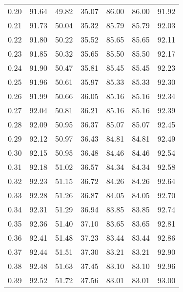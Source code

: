 \begin{tabular}{|c|c|c|c|c|c|c|}
      0.20 &     91.64 &     49.82 &      35.07 &   86.00 &      86.00 &         91.92 \\
      0.21 &     91.73 &     50.04 &      35.32 &   85.79 &      85.79 &         92.03 \\
      0.22 &     91.80 &     50.22 &      35.52 &   85.65 &      85.65 &         92.11 \\
      0.23 &     91.85 &     50.32 &      35.65 &   85.50 &      85.50 &         92.17 \\
      0.24 &     91.90 &     50.47 &      35.81 &   85.45 &      85.45 &         92.23 \\
      0.25 &     91.96 &     50.61 &      35.97 &   85.33 &      85.33 &         92.30 \\
      0.26 &     91.99 &     50.66 &      36.05 &   85.16 &      85.16 &         92.34 \\
      0.27 &     92.04 &     50.81 &      36.21 &   85.16 &      85.16 &         92.39 \\
      0.28 &     92.09 &     50.95 &      36.37 &   85.07 &      85.07 &         92.45 \\
      0.29 &     92.12 &     50.97 &      36.43 &   84.81 &      84.81 &         92.49 \\
      0.30 &     92.15 &     50.95 &      36.48 &   84.46 &      84.46 &         92.54 \\
      0.31 &     92.18 &     51.02 &      36.57 &   84.34 &      84.34 &         92.58 \\
      0.32 &     92.23 &     51.15 &      36.72 &   84.26 &      84.26 &         92.64 \\
      0.33 &     92.28 &     51.26 &      36.87 &   84.05 &      84.05 &         92.70 \\
      0.34 &     92.31 &     51.29 &      36.94 &   83.85 &      83.85 &         92.74 \\
      0.35 &     92.36 &     51.40 &      37.10 &   83.65 &      83.65 &         92.81 \\
      0.36 &     92.41 &     51.48 &      37.23 &   83.44 &      83.44 &         92.86 \\
      0.37 &     92.44 &     51.51 &      37.30 &   83.21 &      83.21 &         92.90 \\
      0.38 &     92.48 &     51.63 &      37.45 &   83.10 &      83.10 &         92.96 \\
      0.39 &     92.52 &     51.72 &      37.56 &   83.01 &      83.01 &         93.00 \\

\end{tabular}
